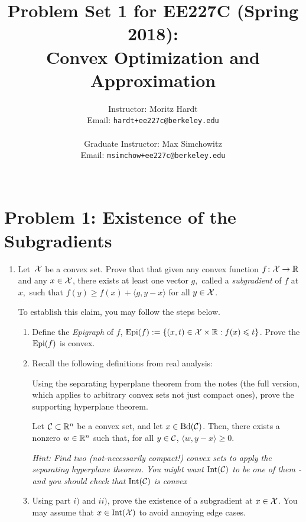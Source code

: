 \documentclass[12pt]{article}
\title{Problem Set 1 for EE227C (Spring 2018):\\
 Convex Optimization and Approximation }
\author{Instructor: Moritz Hardt\\
{\small Email: \tt hardt+ee227c@berkeley.edu}\\ ~\\
Graduate Instructor: Max Simchowitz\\
{\small Email: \tt msimchow+ee227c@berkeley.edu}\\ ~\\
}
\begin{document}


\maketitle

\section*{Problem 1: Existence of the Subgradients}
\begin{enumerate}
\item
Let~${\cal X}$ be a convex set. Prove that that given any convex function $f\colon{\cal X} \to
\mathbb{R}$ and any $x \in {\cal X}$, there exists at least one vector $g,$ called a
\emph{subgradient} of $f$ at $x,$ such that $f(y) \ge f(x) + \langle g, y - x
\rangle$ for all $y \in {\cal X}$. 

To establish this claim, you may follow the steps below.

\begin{enumerate}
\item
Define the \emph{Epigraph} of $f$, $\mathrm{Epi}(f) := \{(x,t) \in {\cal X}
\times \mathbb{R}: f(x) \leqslant t\}$. Prove the $\mathrm{Epi}(f)$ is convex. 
\item
Recall the following definitions from real analysis:
%
\begin{definition*} 
\end{definition*}

Using the separating hyperplane theorem from the notes (the full version, which applies to arbitrary convex sets not just compact ones), prove the supporting hyperplane theorem.
\begin{theorem*} Let ${\cal C} \subset \mathbb{R}^n$ be a convex set,
and let $x \in \mathrm{Bd}({\cal C})$. Then, there exists a nonzero $w \in \mathbb{R}^n$ such that, for all $y \in {\cal C}$, $\langle w, y - x \rangle \ge 0$. 
\end{theorem*}
\emph{Hint:  Find two (not-necessarily compact!) convex sets to apply the separating hyperplane theorem. You might want $\mathrm{Int}({\cal C})$ to be one of them - and you should check that $\mathrm{Int}({\cal C})$ is convex } 

\item
Using part $i)$ and $ii)$, prove the existence of a subgradient at $x \in {\cal X}$. You may assume that $x \in \mathrm{Int}({\cal X})$ to avoid annoying edge cases.
\end{enumerate}


\end{enumerate}
\end{document}
